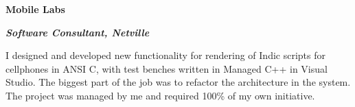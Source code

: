 \item[2006] \textbf{Mobile Labs}

\textit{\textbf{Software Consultant, Netville}}

I designed and developed new functionality for rendering of Indic scripts for cellphones in ANSI C, with test benches written in Managed C++ in Visual Studio. The biggest part of the job was to refactor the architecture in the system. The project was managed by me and required 100\% of my own initiative.